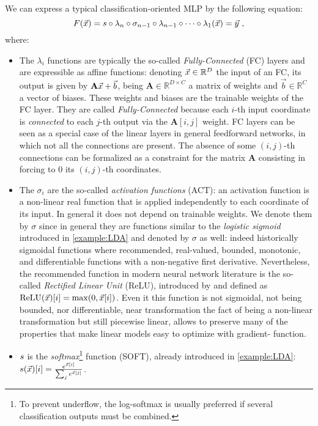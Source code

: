 We can express a typical classification-oriented MLP by the following equation:
\begin{equation}\label{eq:MLP}
F(\vec{x}) = s\circ\lambda_n\circ\sigma_{n-1}\circ\lambda_{n-1}\circ\dots\circ \lambda_1(\vec{x})=\vec{y} \mbox{ ,}
\end{equation}
where:
\begin{itemize}
\item The $\lambda_i$ functions are typically the so-called \emph{Fully-Connected} (FC) layers and are expressible as affine functions: denoting $\vec{x}\in\mathbb{R}^D$ the input of an FC, its output is given by $\textbf{A}\vec{x} + \vec{b}$, being $\textbf{A}\in\mathbb{R}^{D\times C}$ a matrix of weights and $\vec{b}\in\mathbb{R}^C$ a vector of biases. These weights and biases are the trainable weights of the FC layer. They are called \emph{Fully-Connected} because each $i$-th input coordinate is \emph{connected} to each $j$-th output via the $\textbf{A}[i,j]$ weight. FC layers can be seen as a special case of the linear layers in general feedforward networks, in which not all the connections are present. The absence of some $(i,j)$-th connections can be formalized as a constraint for the matrix $\textbf{A}$ consisting in forcing to $0$ its $(i,j)$-th coordinates.

\item  The $\sigma_i$ are the so-called \emph{activation functions} (ACT): an activation function is a non-linear real function that is applied independently to each coordinate of its input. In general it does not depend on trainable weights. We denote them by $\sigma$ since in general they are functions similar to the \emph{logistic sigmoid} introduced in \ref{example:LDA} and denoted by $\sigma$ as well: indeed historically sigmoidal functions where recommended, \ie real-valued, bounded, monotonic, and differentiable functions with a non-negative first derivative. Nevertheless, the recommended function in modern neural network literature is the so-called \emph{Rectified Linear Unit} (ReLU), introduced by \cite{nair2010rectified} and defined as $\mathrm{ReLU}(\vec{x})[i] = \max(0,\vec{x}[i])$. Even it this function is not sigmoidal, not being bounded, nor differentiable, near transformation the fact of being a non-linear transformation but still piecewise linear, allows to preserve many of the properties that make linear models easy to optimize with gradient-
function. 

\item $s$ is the \emph{softmax}\footnote{To prevent underflow, the log-softmax is usually preferred if several classification outputs must be combined.} function (SOFT), already introduced in \ref{example:LDA}: $s(\vec{x})[i] = \frac{e^{\vec{x}[i]}}{\sum_{j}e^{\vec{x}[j]}}$.
\end{itemize}
 
